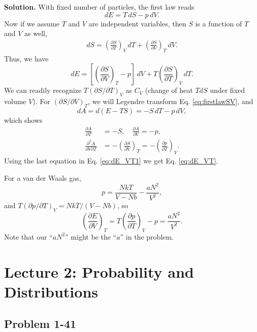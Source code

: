 \documentclass[twocolumn, 10pt]{article}
\numberwithin{equation}{section}
\newenvironment{solution}
{\par\medskip
  \textbf{Solution. }\ignorespaces}
{\medskip}
\begin{document}
\begin{solution}
With fixed number of particles,
the first law reads
\begin{equation}
  dE = T \, dS - p \, dV.
  \label{eq:firstlawSV}
\end{equation}
Now if we assume $T$ and $V$ are independent variables,
then $S$ is a function of $T$ and $V$ as well,
\begin{align*}
dS = \left( \frac{ \partial S }{ \partial T } \right)_V \, dT
+ \left( \frac{ \partial S } { \partial V } \right)_T \, d V.
\end{align*}
Thus, we have
\begin{equation}
  dE =
    \left[\left( \frac{ \partial S } { \partial V } \right)_T -p \right]\, d V
  +T \left( \frac{ \partial S }{ \partial T } \right)_V \, dT.
  \label{eq:dE_VT1}
\end{equation}
We can readily recognize $T(\partial S/\partial T)_V$ as $C_V$
  (change of heat $TdS$ under fixed volume $V$).
%
For $(\partial S/\partial V)_T$,
we will Legendre transform Eq. \eqref{eq:firstlawSV}, and
$$
dA = d(E-TS) = - S \, dT - p \, dV,
$$
which shows
\begin{align*}
  \frac{\partial A } { \partial T} &= -S, \quad 
  \frac{\partial A } { \partial V} = -p, \\
  \frac{\partial^2 A } { \partial V \partial T}
  &=
  -\left( \frac{\partial S }{\partial V} \right)_T
  =
  -\left( \frac{\partial p }{\partial T} \right)_V.
\end{align*}
Using the last equation in Eq. \eqref{eq:dE_VT1}
  we get Eq. \eqref{eq:dE_VT}.

For a van der Waals gas,
  $$
  p = \frac{NkT}{V-Nb} - \frac{aN^2}{V^2},
  $$
  and
  $T (\partial p/\partial T)_V = NkT/(V-Nb)$,
  so
  $$
  \left( \frac{ \partial E } { \partial V} \right)_T
  =
  T \left( \frac{ \partial p} {\partial T } \right)_V - p
  =
  \frac{ a N^2 } { V^2 }.
  $$
Note that our ``$aN^2$'' might be the ``$a$''
in the problem.
\end{solution}

\section{Lecture 2: Probability and Distributions}

\subsection{Problem 1-41}
\end{document}
